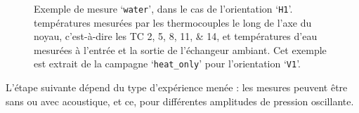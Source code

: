 \begin{figure}[!ht]
    \centering
	\begin{subfigure}{\textwidth}
		\centering
		
		\caption{}
		\label{fig:WaterOnly_TC}
	\end{subfigure}
		
	\vspace{1em}
	
	\begin{subfigure}{\textwidth}
		\centering
		
		\caption{}
		\label{fig:WaterOnly_PT}
	\end{subfigure}	
	
%	
%		
    \caption{Exemple de mesure `\texttt{water}', dans le cas de l'orientation `\texttt{H1}'.  températures mesurées par les thermocouples le long de l'axe du noyau, c'est-à-dire les TC \numlist{2;5;8;11;14}, et  températures d'eau mesurées à l'entrée et la sortie de l'échangeur ambiant. Cet exemple est extrait de la campagne `\texttt{heat\_only}' pour l'orientation `\texttt{V1}'.}
    \label{fig:WaterOnly}
\end{figure}

L'étape suivante dépend du type d'expérience menée : les mesures peuvent être sans ou avec acoustique, et ce, pour  différentes amplitudes de pression oscillante. %

